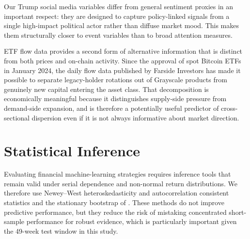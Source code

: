 Our Trump social media variables differ from general sentiment proxies in an
important respect: they are designed to capture policy-linked signals from a
single high-impact political actor rather than diffuse market mood.
This makes them structurally closer to event variables than to broad
attention measures.

ETF flow data provides a second form of alternative information that is
distinct from both prices and on-chain activity.
Since the approval of spot Bitcoin ETFs in January 2024, the daily flow data
published by Farside Investors
\citep{bitcoin_etf_farside,ethereum_etf_farside} has made it possible to separate
legacy-holder rotations out of Grayscale products from genuinely new capital
entering the asset class.
That decomposition is economically meaningful because it distinguishes
supply-side pressure from demand-side expansion, and is therefore a
potentially useful predictor of cross-sectional dispersion even if it is not
always informative about market direction.

\section{Statistical Inference}

Evaluating financial machine-learning strategies requires inference tools
that remain valid under serial dependence and non-normal return
distributions.
We therefore use Newey--West heteroskedasticity and autocorrelation
consistent statistics \citep{newey1987simple,newey1994automatic} and the
stationary bootstrap of \citet{politis1994stationary}.
These methods do not improve predictive performance, but they reduce the
risk of mistaking concentrated short-sample performance for robust evidence,
which is particularly important given the 49-week test window in this study.
